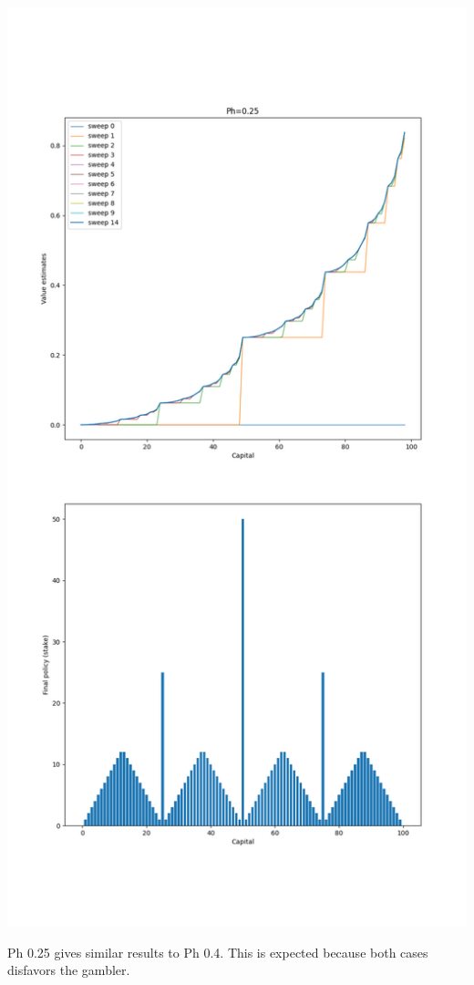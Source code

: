 \documentclass[11pt]{article}
\begin{document}
    \includegraphics[scale=0.4]{figure_4_3_e_4_9_p25}

    Ph 0.25 gives similar results to Ph 0.4. This is expected because both cases disfavors the gambler.
\end{document}
